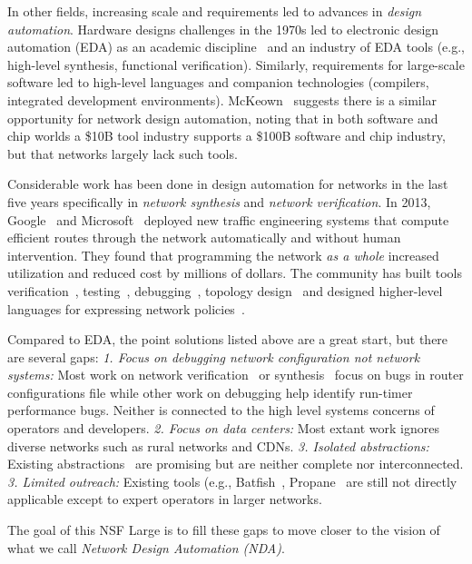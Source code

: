 In other fields, increasing scale and requirements led to advances in \emph{design automation}. Hardware designs challenges in the 1970s led to electronic design automation (EDA) as an academic discipline~\cite{alberto} and an industry of EDA tools (e.g., high-level synthesis, functional verification). Similarly, requirements for large-scale software led to high-level languages and companion technologies (compilers, integrated development environments).   McKeown~\cite{mckeown} suggests there is a similar opportunity for network design automation, noting that in both software and chip worlds a \$10B tool industry supports a \$100B software and chip industry, but that networks largely lack such tools. 

Considerable work has been done in design automation for networks in the last five years specifically in {\em network synthesis} and \emph{network verification}.  In 2013, Google~\cite{b4} and Microsoft~\cite{swan} deployed new traffic engineering systems that compute efficient routes through the network automatically and without human intervention. They found that programming the network {\em as a whole} increased utilization and reduced cost by millions of dollars. The community has built tools verification~\cite{veriflow,hsa,lam}, testing~\cite{atpg,nice}, debugging~\cite{xtrace,marple}, topology design~\cite{condor} and designed higher-level languages for expressing network policies~\cite{netkat,propane}.

Compared to EDA, the point solutions listed above are a great start, but there are several gaps: {\em 1. Focus on debugging network configuration not network systems:}  Most work on
network verification~\cite{hsa,veriflow,minesweeper} or synthesis~\cite{netkat,propane} focus
on bugs in router configurations file while other work on debugging \cite{bsd,pathqueries,marple} help identify run-timer performance bugs.  Neither is
connected to the high level systems concerns of operators and developers.  
{\em 2. Focus on data centers:} Most extant work ignores diverse networks such
as rural networks and CDNs. {\em 3. Isolated abstractions:} Existing
abstractions~\cite{netkat,propane,hsa,Ethane,4DControlPlane} are promising but are neither
complete nor interconnected.  {\em 3. Limited outreach:} Existing tools (e.g., Batfish~\cite{batfish}, Propane~\cite{propane} are still not directly
applicable except to expert operators in larger networks.

The goal of this NSF Large is to fill these gaps to move closer to the vision of what we call \emph{Network Design Automation (NDA)}.

